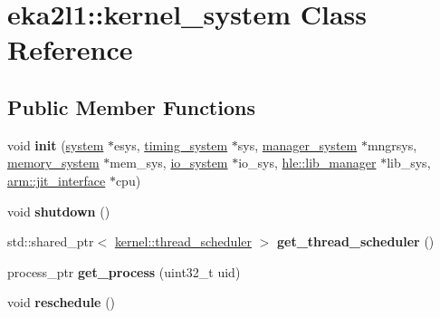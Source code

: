 \hypertarget{classeka2l1_1_1kernel__system}{}\section{eka2l1\+:\+:kernel\+\_\+system Class Reference}
\label{classeka2l1_1_1kernel__system}
\subsection*{Public Member Functions}
\begin{DoxyCompactItemize}
\item 
\mbox{\label{classeka2l1_1_1kernel__system_a3107f13c6cbdcffa88526902c39db633}} 
void {\bfseries init} (\mbox{\hyperlink{classeka2l1_1_1system}{system}} $\ast$esys, \mbox{\hyperlink{classeka2l1_1_1timing__system}{timing\+\_\+system}} $\ast$sys, \mbox{\hyperlink{classeka2l1_1_1manager__system}{manager\+\_\+system}} $\ast$mngrsys, \mbox{\hyperlink{classeka2l1_1_1memory__system}{memory\+\_\+system}} $\ast$mem\+\_\+sys, \mbox{\hyperlink{classeka2l1_1_1io__system}{io\+\_\+system}} $\ast$io\+\_\+sys, \mbox{\hyperlink{classeka2l1_1_1hle_1_1lib__manager}{hle\+::lib\+\_\+manager}} $\ast$lib\+\_\+sys, \mbox{\hyperlink{classeka2l1_1_1arm_1_1jit__interface}{arm\+::jit\+\_\+interface}} $\ast$cpu)
\item 
\mbox{\label{classeka2l1_1_1kernel__system_abbceec287487d74585474ce6dd04d746}} 
void {\bfseries shutdown} ()
\item 
\mbox{\label{classeka2l1_1_1kernel__system_abaeb2f43aadeddc8233ea25ae9d5ff6d}} 
std\+::shared\+\_\+ptr$<$ \mbox{\hyperlink{classeka2l1_1_1kernel_1_1thread__scheduler}{kernel\+::thread\+\_\+scheduler}} $>$ {\bfseries get\+\_\+thread\+\_\+scheduler} ()
\item 
\mbox{\label{classeka2l1_1_1kernel__system_af6d246fa4d601f860ed90d44c77c2f55}} 
process\+\_\+ptr {\bfseries get\+\_\+process} (uint32\+\_\+t uid)
\item 
\mbox{\label{classeka2l1_1_1kernel__system_a305b9bbb2b5adcfca46dcbc17dab6c66}} 
void {\bfseries reschedule} ()
\item 

\end{DoxyCompactItemize}
